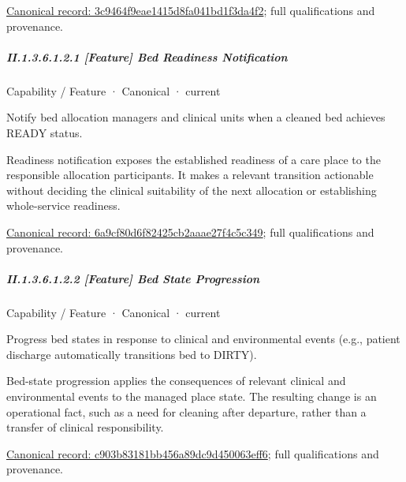 {\footnotesize \href{../../../../../../../continuum/strategy/capability/3c9464f9eae1415d8fa041bd1f3da4f2.md}{Canonical record: 3c9464f9eae1415d8fa041bd1f3da4f2}; full qualifications and provenance.}\par
\subparagraph*{II.1.3.6.1.2.1 [Feature] Bed Readiness Notification}
\label{navigation:II.1.3.6.1.2.1}

\label{element:6a9cf80d6f82425cb2aaae27f4c5c349}
{\small Capability / Feature · Canonical · current}\par

Notify bed allocation managers and clinical units when a cleaned bed achieves READY status.



Readiness notification exposes the established readiness of a care place to the responsible allocation participants. It makes a relevant transition actionable without deciding the clinical suitability of the next allocation or establishing whole-service readiness.


{\footnotesize \href{../../../../../../../continuum/strategy/capability/feature/6a9cf80d6f82425cb2aaae27f4c5c349.md}{Canonical record: 6a9cf80d6f82425cb2aaae27f4c5c349}; full qualifications and provenance.}\par
\subparagraph*{II.1.3.6.1.2.2 [Feature] Bed State Progression}
\label{navigation:II.1.3.6.1.2.2}

\label{element:c903b83181bb456a89dc9d450063eff6}
{\small Capability / Feature · Canonical · current}\par

Progress bed states in response to clinical and environmental events (e.g., patient discharge automatically transitions bed to DIRTY).



Bed-state progression applies the consequences of relevant clinical and environmental events to the managed place state. The resulting change is an operational fact, such as a need for cleaning after departure, rather than a transfer of clinical responsibility.


{\footnotesize \href{../../../../../../../continuum/strategy/capability/feature/c903b83181bb456a89dc9d450063eff6.md}{Canonical record: c903b83181bb456a89dc9d450063eff6}; full qualifications and provenance.}\par
